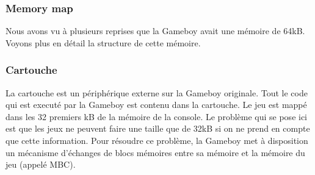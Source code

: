 \documentclass[a4paper]{article}
\begin{document}
\subsubsection{Memory map}
Nous avons vu à plusieurs reprises que la Gameboy avait une mémoire de 64kB.
Voyons plus en détail la structure de cette mémoire.
\begin{center}
\end{center}

\subsubsection{Cartouche}

La cartouche est un périphérique externe sur la Gameboy originale. Tout le code
qui est executé par la Gameboy est contenu dans la cartouche. Le jeu est mappé 
dans les 32 premiers kB de la mémoire de la console. Le problème qui se pose ici
est que les jeux ne peuvent faire une taille que de 32kB si on ne prend en compte
que cette information. Pour résoudre ce problème, la Gameboy met à disposition 
un mécanisme d'échanges de blocs mémoires entre sa mémoire et la mémoire du jeu 
(appelé MBC). \\
\end{document}
